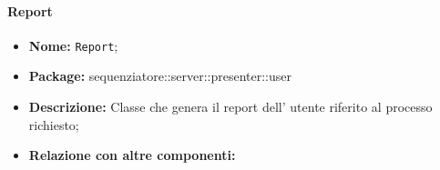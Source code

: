 \paragraph{Report}
	\begin{itemize}
		\item \textbf{Nome:} \texttt{Report};
		\item \textbf{Package:} sequenziatore::server::presenter::user
		\item \textbf{Descrizione:} Classe che genera il report dell' utente riferito al processo richiesto;
		\item \textbf{Relazione con altre componenti:}
	\end{itemize}
